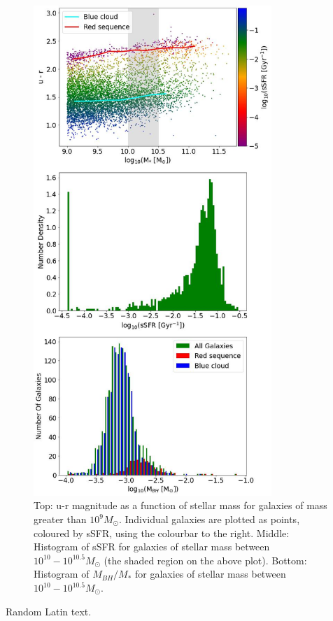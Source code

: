 \documentclass[12pt, onecolumn]{revtex4}    %
\begin{document}
\begin{figure}[H]
\centering
\includegraphics[width=9cm]{Plot_1.jpeg}
\caption{Top: u-r magnitude as a function of stellar mass for galaxies of mass greater than $10^9M_\odot$. Individual galaxies are plotted as points, coloured by sSFR, using the colourbar to the right. Middle: Histogram of sSFR for galaxies of stellar mass between $10^{10} - 10^{10.5}M_\odot$ (the shaded region on the above plot). Bottom: Histogram of $M_{BH}/M_*$ for galaxies of stellar mass between $10^{10} - 10^{10.5}M_\odot$.}
\label{fig:1}
\end{figure}

\newpage

Random Latin text.
\end{document}
